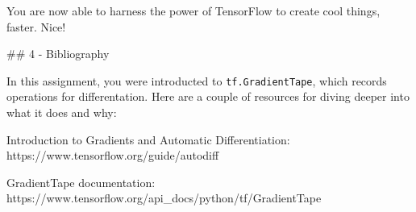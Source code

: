 \documentclass[11pt]{article}
\makeatletter
\newcommand{\boxspacing}{\kern\kvtcb@left@rule\kern\kvtcb@boxsep}
\newcommand{\prompt}[4]{
        \ttfamily\llap{{\color{#2}[#3]:\hspace{3pt}#4}}\vspace{-\baselineskip}
    }
\makeatother
\begin{document}
You are now able to harness the power of TensorFlow to create cool
things, faster. Nice!

    \#\# 4 - Bibliography

In this assignment, you were introducted to \texttt{tf.GradientTape},
which records operations for differentation. Here are a couple of
resources for diving deeper into what it does and why:

Introduction to Gradients and Automatic Differentiation:
https://www.tensorflow.org/guide/autodiff

GradientTape documentation:
https://www.tensorflow.org/api\_docs/python/tf/GradientTape

    \begin{tcolorbox}[breakable, size=fbox, boxrule=1pt, pad at break*=1mm,colback=cellbackground, colframe=cellborder]
\prompt{In}{incolor}{ }{\boxspacing}
\begin{Verbatim}[commandchars=\\\{\}]

\end{Verbatim}
\end{tcolorbox}


    
    
    
\end{document}
